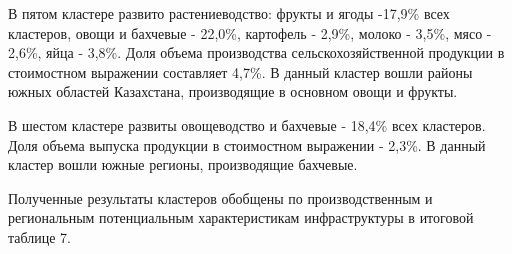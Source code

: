 \begin{multicols}{2}
В пятом кластере развито растениеводство: фрукты и ягоды -17,9\% всех
кластеров, овощи и бахчевые - 22,0\%, картофель - 2,9\%, молоко - 3,5\%,
мясо - 2,6\%, яйца - 3,8\%. Доля объема производства
сельскохозяйственной продукции в стоимостном выражении составляет 4,7\%.
В данный кластер вошли районы южных областей Казахстана, производящие в
основном овощи и фрукты.

В шестом кластере развиты овощеводство и бахчевые - 18,4\% всех
кластеров. Доля объема выпуска продукции в стоимостном выражении -
2,3\%. В данный кластер вошли южные регионы, производящие бахчевые.

Полученные результаты кластеров обобщены по производственным и
региональным потенциальным характеристикам инфраструктуры в итоговой
таблице 7.
\end{multicols}


